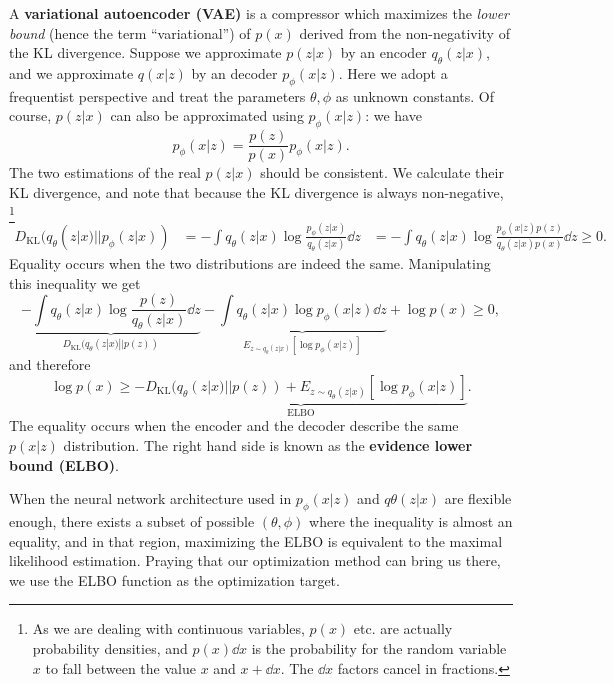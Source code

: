 \documentclass[hyperref, a4paper, 12pt]{report}
\newcommand*{\concept}[1]{{\textbf{#1}}}
\def\\{}%
\def\mathbb#1{#1}%
\begin{document}
A \concept{variational autoencoder (VAE)} is a compressor which maximizes the \emph{lower bound}
(hence the term ``variational'') of $p(x)$ derived from the non-negativity of the KL divergence.
Suppose we approximate $p(z|x)$ by an encoder $q_\theta(z | x)$,
and we approximate $q(x|z)$ by an decoder $p_\phi(x | z)$.
Here we adopt a frequentist perspective and treat the parameters $\theta, \phi$ as unknown constants.
Of course, $p(z | x)$ can also be approximated using $p_\phi(x | z)$: we have 
\begin{equation}
    p_\phi(x | z) = \frac{p(z)}{p(x)} p_\phi(x | z).
\end{equation}
The two estimations of the real $p(z | x)$ should be consistent.
We calculate their KL divergence, and note that because the KL divergence is always non-negative,%
\footnote{
    As we are dealing with continuous variables, $p(x)$ etc. are actually probability densities,
    and $p(x) \dd{x}$ is the probability for the random variable $x$ to fall between the value $x$ and $x + \dd{x}$.
    The $\dd{x}$ factors cancel in fractions.
}
\begin{equation}
    \begin{aligned}
        D_{\text{KL}}(q_\theta(z|x) || p_\phi(z|x)) &= - \int q_\theta(z|x) \log \frac{p_\phi(z|x)}{q_\theta(z|x)} \dd{z} \\
        &= - \int q_\theta(z|x) \log \frac{p_\phi(x|z) p(z)}{q_\theta(z|x) p(x)} \dd{z} \geq 0.
    \end{aligned}
\end{equation} 
Equality occurs when the two distributions are indeed the same.
Manipulating this inequality we get 
\[
    \underbrace{- \int q_\theta(z|x) \log \frac{p(z)}{q_\theta(z|x)} \dd{z}}_{D_{\text{KL}}(q_\theta(z|x) ||p(z))} - \underbrace{\int q_\theta(z|x)  \log p_\phi(x|z) \dd{z}}_{\mathbb{E}_{z\sim q_\theta(z|x)}[\log p_\phi(x|z)]} + \log p(x) \geq 0,
\]
and therefore 
\begin{equation}
    \log p(x) \geq \underbrace{- D_{\text{KL}}(q_\theta(z|x) ||p(z)) + \mathbb{E}_{z\sim q_\theta(z|x)}[\log p_\phi(x|z)]}_{\text{ELBO}}.
    \label{eq:loss.vae.gaussian.elbo}
\end{equation}
The equality occurs when the encoder and the decoder describe the same $p(x|z)$ distribution.
The right hand side is known as the \concept{evidence lower bound (ELBO)}.

When the neural network architecture used in $p_\phi(x|z)$ and $q\theta(z|x)$ are flexible enough,
there exists a subset of possible $(\theta, \phi)$ where the inequality is almost an equality,
and in that region, maximizing the ELBO is equivalent to the maximal likelihood estimation.
Praying that our optimization method can bring us there,
we use the ELBO function as the optimization target.
\end{document}
